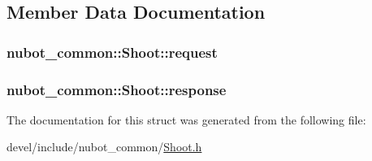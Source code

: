 \subsection{Member Data Documentation}
\hypertarget{structnubot__common_1_1Shoot_a928906d0aad7d7ced9018bc3a29dfdcf}{
\subsubsection[{request}]{ nubot\-\_\-common\-::\-Shoot\-::request}}\label{structnubot__common_1_1Shoot_a928906d0aad7d7ced9018bc3a29dfdcf}
\hypertarget{structnubot__common_1_1Shoot_ad087c631d279c2f929abf994fc814db5}{
\subsubsection[{response}]{ nubot\-\_\-common\-::\-Shoot\-::response}}\label{structnubot__common_1_1Shoot_ad087c631d279c2f929abf994fc814db5}


The documentation for this struct was generated from the following file\-:\begin{DoxyCompactItemize}
\item 
devel/include/nubot\-\_\-common/\hyperlink{Shoot_8h}{Shoot.\-h}\end{DoxyCompactItemize}
